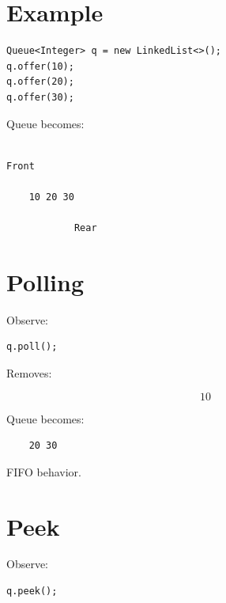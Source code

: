 \documentclass[11pt,a4paper]{book}
\begin{document}

\section{Example}

\begin{verbatim} 
Queue<Integer> q = new LinkedList<>();
q.offer(10);
q.offer(20);
q.offer(30);
\end{verbatim}


Queue becomes:

\begin{verbatim}

Front

    10 20 30

            Rear

\end{verbatim}
\newpage

\section{Polling}
Observe:
\begin{verbatim} 
q.poll();
\end{verbatim}

Removes:

\[
10
\]


Queue becomes:

\begin{verbatim}
    20 30
\end{verbatim}

\textcolor{RosettaBlue}{FIFO} behavior.


\section{Peek}

Observe:

\begin{verbatim} 
q.peek();
\end{verbatim}

\end{document}
